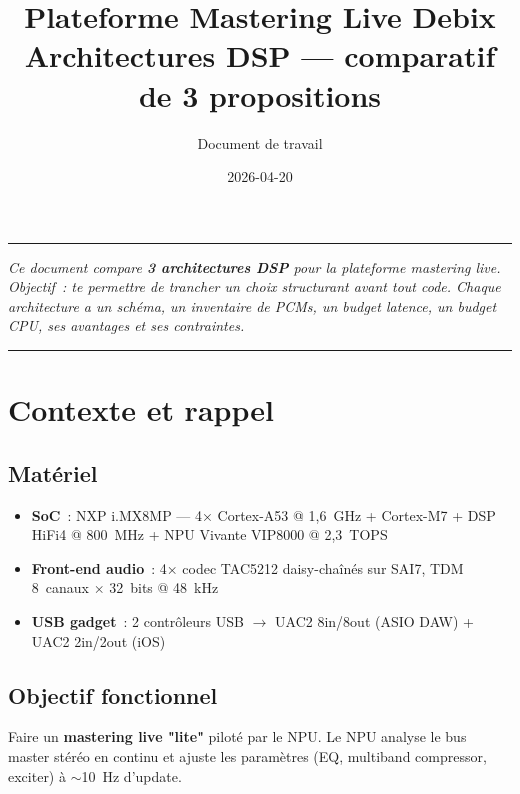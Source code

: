 \documentclass[11pt,a4paper]{article}
\title{\textbf{Plateforme Mastering Live Debix}\\[4pt]
  \large Architectures DSP --- comparatif de 3 propositions}
\author{Document de travail}
\date{2026-04-20}
\begin{document}
\maketitle

\tableofcontents
\vspace{1em}

\hrule
\vspace{0.5em}
\noindent\textit{Ce document compare \textbf{3 architectures DSP} pour la plateforme mastering live. Objectif~: te permettre de trancher un choix structurant avant tout code. Chaque architecture a un schéma, un inventaire de PCMs, un budget latence, un budget CPU, ses avantages et ses contraintes.}
\vspace{0.5em}
\hrule

\section{Contexte et rappel}

\subsection{Matériel}
\begin{itemize}[leftmargin=*, itemsep=2pt]
  \item \textbf{SoC}~: NXP i.MX8MP --- 4× Cortex-A53 @ 1{,}6~GHz + Cortex-M7 + DSP HiFi4 @ 800~MHz + NPU Vivante VIP8000 @ 2{,}3~TOPS
  \item \textbf{Front-end audio}~: 4× codec TAC5212 daisy-chaînés sur SAI7, TDM 8~canaux $\times$ 32~bits @ 48~kHz
  \item \textbf{USB gadget}~: 2 contrôleurs USB $\rightarrow$ UAC2 8in/8out (ASIO DAW) + UAC2 2in/2out (iOS)
\end{itemize}

\subsection{Objectif fonctionnel}
Faire un \textbf{mastering live "lite"} piloté par le NPU. Le NPU analyse le bus master stéréo en continu et ajuste les paramètres (EQ, multiband compressor, exciter) à $\sim$10~Hz d'update.
\end{document}
